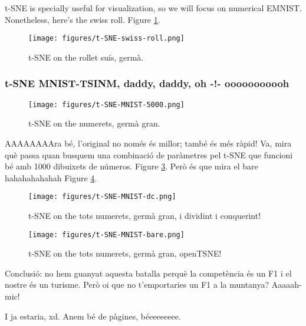 t-SNE is specially useful for visualization, so we will focus on numerical EMNIST. Nonetheless, here's the swiss roll. Figure \ref{fig:t-SNE-swiss-roll}.

\begin{figure}[ht]
    \centering
    \texttt{[image: figures/t-SNE-swiss-roll.png]}
    \caption{t-SNE on the rollet suís, germà.}
    \label{fig:t-SNE-swiss-roll}
\end{figure}

\subsubsection{t-SNE MNIST-TSINM, daddy, daddy, oh -!- ooooooooooh}

\begin{figure}[ht]
    \centering
    \texttt{[image: figures/t-SNE-MNIST-5000.png]}
    \caption{t-SNE on the numerets, germà gran.}
    \label{fig:t-SNE-MNIST}
\end{figure}

AAAAAAAAra bé, l'original no només és millor; també és més ràpid! Va, mira què passa quan busquem una combinació de paràmetres pel t-SNE que funcioni bé amb 1000 dibuixets de números. Figure \ref{fig:t-SNE-MNIST-dc}. Però és que mira el bare hahahahahahah Figure \ref{fig:t-SNE-MNIST-bare}.

\begin{figure}[ht]
    \centering
    \texttt{[image: figures/t-SNE-MNIST-dc.png]}
    \caption{t-SNE on the tots numerets, germà gran, i dividint i conquerint!}
    \label{fig:t-SNE-MNIST-dc}
\end{figure}

\begin{figure}[ht]
    \centering
    \texttt{[image: figures/t-SNE-MNIST-bare.png]}
    \caption{t-SNE on the tots numerets, germà gran, openTSNE!}
    \label{fig:t-SNE-MNIST-bare}
\end{figure}

Conclusió: no hem guanyat aquesta batalla perquè la competència és un F1 i el nostre és un turisme. Però oi que no t'emportaries un F1 a la muntanya? Aaaaah-mic!

I ja estaria, xd. Anem bé de pàgines, béeeeeeeee.